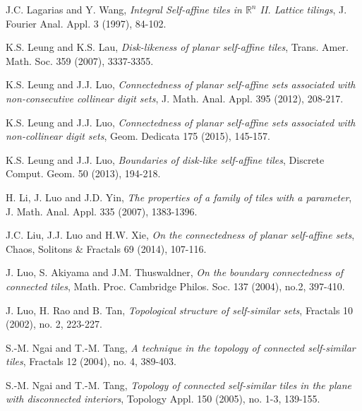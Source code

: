 \documentclass[12pt, reqno]{amsart}
\numberwithin{equation}{section}
\begin{document}
\begin{thebibliography}{99}
 J.C. Lagarias and Y. Wang, {\it Integral Self-affine tiles in ${\mathbb R}^n$ II. Lattice tilings}, J. Fourier Anal. Appl. 3 (1997), 84-102.

  K.S. Leung and  K.S. Lau, {\it Disk-likeness of planar self-affine tiles}, Trans. Amer. Math. Soc. {359} (2007), 3337-3355.

  K.S. Leung and J.J. Luo, {\it Connectedness of planar self-affine sets associated with non-consecutive collinear digit sets}, J. Math. Anal. Appl. 395 (2012),  208-217.

  K.S. Leung and J.J. Luo, {\it Connectedness of planar self-affine sets associated with non-collinear digit sets}, Geom. Dedicata 175 (2015), 145-157.

  K.S. Leung and J.J. Luo, {\it Boundaries of disk-like self-affine tiles}, Discrete Comput. Geom. 50 (2013), 194-218.

 H. Li, J. Luo and J.D. Yin, {\it The properties of a family of tiles with a parameter}, J. Math. Anal. Appl. 335 (2007), 1383-1396.

 J.C. Liu, J.J. Luo and H.W. Xie, {\it On the connectedness of planar self-affine sets}, Chaos, Solitons \& Fractals 69 (2014), 107-116.

 J. Luo,  S. Akiyama and J.M. Thuswaldner,  {\it On the boundary connectedness of connected tiles}, Math. Proc. Cambridge Philos. Soc. 137 (2004), no.2, 397-410. 

  J. Luo, H. Rao and B. Tan, {\it Topological structure of self-similar sets}, Fractals 10 (2002), no. 2, 223-227.

 S.-M. Ngai and T.-M. Tang, {\it A technique in the topology of connected self-similar tiles}, Fractals 12 (2004), no. 4, 389-403.

 S.-M. Ngai and T.-M. Tang, {\it Topology of connected self-similar tiles in the plane with disconnected interiors}, Topology Appl. 150 (2005), no. 1-3, 139-155.


\end{thebibliography}
\end{document}
